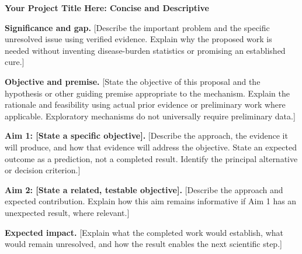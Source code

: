 \documentclass[11pt,letterpaper]{article}
\begin{document}
\begin{center}
\textbf{Your Project Title Here: Concise and Descriptive}
\end{center}

\textbf{Significance and gap.} [Describe the important problem and the specific
unresolved issue using verified evidence. Explain why the proposed work is needed
without inventing disease-burden statistics or promising an established cure.]

\textbf{Objective and premise.} [State the objective of this proposal and the
hypothesis or other guiding premise appropriate to the mechanism. Explain the
rationale and feasibility using actual prior evidence or preliminary work where
applicable. Exploratory mechanisms do not universally require preliminary data.]

\textbf{Aim 1: [State a specific objective].}
[Describe the approach, the evidence it will produce, and how that evidence will
address the objective. State an expected outcome as a prediction, not a completed
result. Identify the principal alternative or decision criterion.]

\textbf{Aim 2: [State a related, testable objective].}
[Describe the approach and expected contribution. Explain how this aim remains
informative if Aim 1 has an unexpected result, where relevant.]


\textbf{Expected impact.} [Explain what the completed work would establish, what
would remain unresolved, and how the result enables the next scientific step.]
\end{document}
